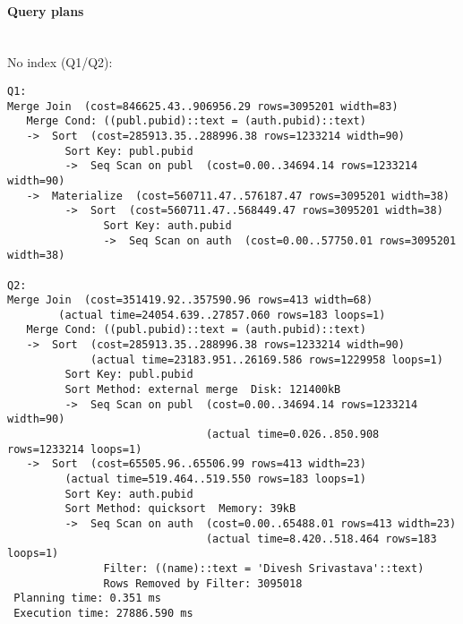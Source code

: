 \documentclass[11pt]{scrartcl}
\begin{document}
\paragraph{Query plans}\mbox{}\\ 

\noindent No index (Q1/Q2):
{\small
\begin{verbatim}
Q1:
Merge Join  (cost=846625.43..906956.29 rows=3095201 width=83)
   Merge Cond: ((publ.pubid)::text = (auth.pubid)::text)
   ->  Sort  (cost=285913.35..288996.38 rows=1233214 width=90)
         Sort Key: publ.pubid
         ->  Seq Scan on publ  (cost=0.00..34694.14 rows=1233214 width=90)
   ->  Materialize  (cost=560711.47..576187.47 rows=3095201 width=38)
         ->  Sort  (cost=560711.47..568449.47 rows=3095201 width=38)
               Sort Key: auth.pubid
               ->  Seq Scan on auth  (cost=0.00..57750.01 rows=3095201 width=38)

Q2:
Merge Join  (cost=351419.92..357590.96 rows=413 width=68) 
	    (actual time=24054.639..27857.060 rows=183 loops=1)
   Merge Cond: ((publ.pubid)::text = (auth.pubid)::text)
   ->  Sort  (cost=285913.35..288996.38 rows=1233214 width=90) 
             (actual time=23183.951..26169.586 rows=1229958 loops=1)
         Sort Key: publ.pubid
         Sort Method: external merge  Disk: 121400kB
         ->  Seq Scan on publ  (cost=0.00..34694.14 rows=1233214 width=90) 
                               (actual time=0.026..850.908 rows=1233214 loops=1)
   ->  Sort  (cost=65505.96..65506.99 rows=413 width=23) 
	     (actual time=519.464..519.550 rows=183 loops=1)
         Sort Key: auth.pubid
         Sort Method: quicksort  Memory: 39kB
         ->  Seq Scan on auth  (cost=0.00..65488.01 rows=413 width=23) 
                               (actual time=8.420..518.464 rows=183 loops=1)
               Filter: ((name)::text = 'Divesh Srivastava'::text)
               Rows Removed by Filter: 3095018
 Planning time: 0.351 ms
 Execution time: 27886.590 ms
\end{verbatim}
}
\end{document}
